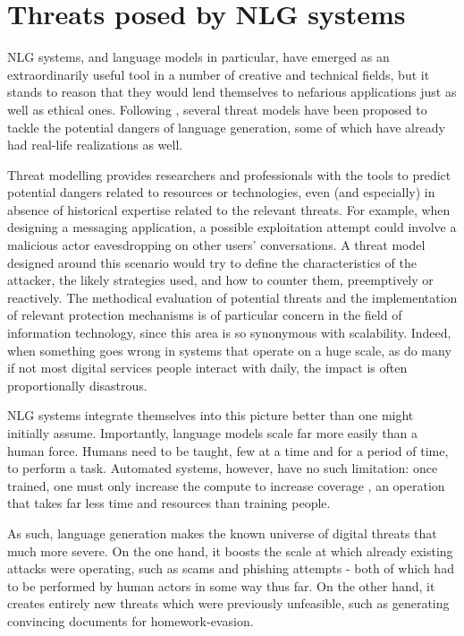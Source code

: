 \section{Threats posed by NLG systems}
\label{sec:threats}

NLG systems, and language models in particular, have emerged as an extraordinarily useful tool in a number of creative and technical fields, but it stands to reason that they would lend themselves to nefarious applications just as well as ethical ones.
Following \citet{crothers2023machinegeneratedtextcomprehensive}, several threat models \citep{shostack2014security} have been proposed to tackle the potential dangers of language generation, some of which have already had real-life realizations as well.

Threat modelling provides researchers and professionals with the tools to predict potential dangers related to resources or technologies, even (and especially) in absence of historical expertise related to the relevant threats.
For example, when designing a messaging application, a possible exploitation attempt could involve a malicious actor eavesdropping on other users' conversations.
A threat model designed around this scenario would try to define the characteristics of the attacker, the likely strategies used, and how to counter them, preemptively or reactively.
The methodical evaluation of potential threats and the implementation of relevant protection mechanisms is of particular concern in the field of information technology, since this area is so synonymous with scalability.
Indeed, when something goes wrong in systems that operate on a huge scale, as do many if not most digital services people interact with daily, the impact is often proportionally disastrous.

NLG systems integrate themselves into this picture better than one might initially assume.
Importantly, language models scale far more easily than a human force. Humans need to be taught, few at a time and for a period of time, to perform a task.
Automated systems, however, have no such limitation: once trained, one must only increase the compute to increase coverage \citep{crothers2023machinegeneratedtextcomprehensive}, an operation that takes far less time and resources than training people.

As such, language generation makes the known universe of digital threats that much more severe.
On the one hand, it boosts the scale at which already existing attacks were operating, such as scams and phishing attempts - both of which had to be performed by human actors in some way thus far.
On the other hand, it creates entirely new threats which were previously unfeasible, such as generating convincing documents for homework-evasion.

